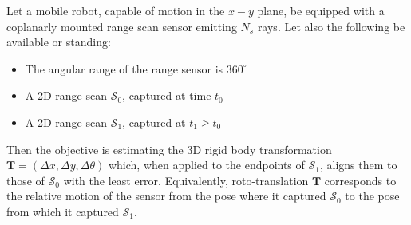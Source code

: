 \begin{problem}
  \label{prob:the_problem}
  Let a mobile robot, capable of motion in the $x-y$ plane, be equipped with a
  coplanarly mounted range scan sensor emitting $N_s$ rays. Let
  also the following be available or standing:
  \begin{itemize}
    \item The angular range of the range sensor is $360^\circ$
    \item A 2D range scan $\mathcal{S}_0$, captured at time $t_0$
    \item A 2D range scan $\mathcal{S}_1$, captured at $t_1 \geq t_0$
  \end{itemize}
\end{problem}
Then the objective is estimating the 3D rigid body transformation
$\bm{T} = (\Delta x, \Delta y, \Delta \theta)$ which, when applied to the
endpoints of $\mathcal{S}_1$, aligns them to those of $\mathcal{S}_0$ with the
least error. Equivalently, roto-translation $\bm{T}$ corresponds to the
relative motion of the sensor from the pose where it captured $\mathcal{S}_0$
to the pose from which it captured $\mathcal{S}_1$.
